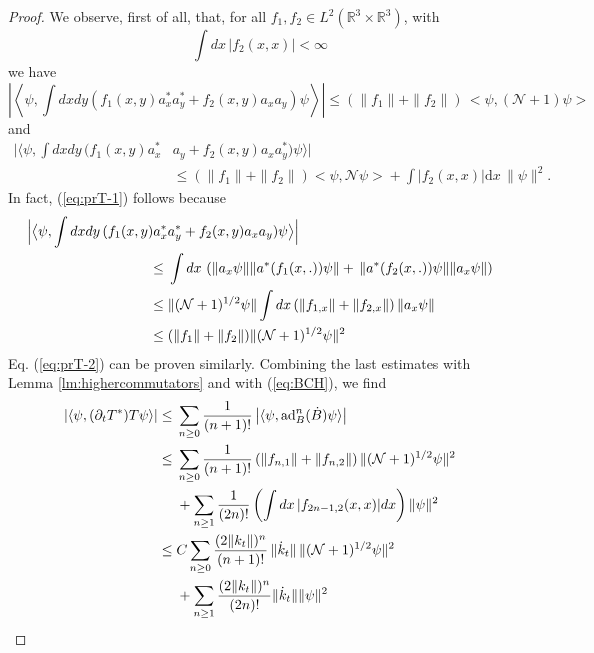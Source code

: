 \documentclass[11pt,a4paper,DIV11]{scrartcl}	%
\newcommand{\bR}{{\mathbb R}}
\newcommand{\cN}{{\cal N}}
\newcommand{\di}{\textrm{d}}		%
\newcommand{\Ncal}{\mathcal{N}}		%
\newcommand{\scal}[2]{\big<#1,#2\big>} %
\begin{document}
\begin{proof}
We observe, first of all, that, for all $f_1, f_2 \in L^2 (\bR^3 \times\bR^3)$, with 
\[ \int dx \, |f_2 (x,x)| < \infty \]
we have
\begin{equation}\label{eq:prT-1}  \left| \left\langle \psi, \int dx dy \left( f_1(x,y) a^\ast_x a^\ast_y + f_2(x,y) a_x a_y \right) \psi \right\rangle \right|  \leq (\| f_1 \| + \| f_2 \|) \, \scal{\psi}{(\Ncal+1)\psi} 
\end{equation}
and
\begin{equation}\label{eq:prT-2} \begin{split} \Big|  \big\langle \psi , \int dx dy \, ( f_1(x,y) a^\ast_x
& a_y + f_2(x,y) a_x a^\ast_y ) \psi \big\rangle \Big|  \\ & \leq (\| f_1 \| + \| f_2 \|) \scal{\psi}{\Ncal\psi} + \int |f_2(x,x)| \di x  \, \| \psi \|^2 .
\end{split} \end{equation}
In fact, (\ref{eq:prT-1}) follows because
\[ \begin{split} 
 \Big| \big\langle \psi, \int dx dy \, ( f_1(x,y) a^\ast_x &a^\ast_y + f_2(x,y) a_x a_y) \psi \big\rangle \Big| \\
 \leq \; & \int dx \, \left( \| a_x \psi \| \| a^* (f_1(x,.)) \psi \| +  \, \| a^* (f_2 (x,.)) \psi \| \| a_x \psi \| \right) \\
 \leq \; & \| (\cN +1)^{1/2} \psi \|  \int dx \, (\| f_{1,x} \| + \| f_{2,x}\|) \,  \| a_x \psi \| \\
 \leq \; & (\| f_1 \| + \| f_2 \|) \| (\cN+1)^{1/2} \psi \|^2
 \end{split} \]
 Eq. (\ref{eq:prT-2}) can be proven similarly. Combining the last estimates with Lemma \ref{lm:highercommutators} and with (\ref{eq:BCH}), we find
 \[ \begin{split} 
| \langle \psi , (\partial_t T^*)T \psi \rangle|  \leq \; &\sum_{n \geq 0} \frac{1}{(n+1)!} \left| \langle \psi , \text{ad}^n_B (\dot{B}) \psi \rangle \right| \\
\leq \; &\sum_{n \geq 0} \frac{1}{(n+1)!} \left( \| f_{n,1} \| + \| f_{n,2} \| \right)  \| (\cN+1)^{1/2} \psi \|^2 \\& + \sum_{n\geq 1} \frac{1}{(2n)!}  \left(\int dx \, |f_{2n-1,2} (x,x)| dx \right)  \| \psi \|^2 \\
\leq \; &C \sum_{n\geq 0} \frac{(2 \| k_t \|)^n}{(n+1)!} \, \| \dot{k}_t \| \, \| (\cN+1)^{1/2} \psi \|^2 \\ &+ 
\sum_{n\geq 1} \frac{(2\| k_t \|)^n}{(2n)!}  \| \dot k_t \| \| \psi \|^2 \\ 

\end{split}\]
\end{proof}
\end{document}

